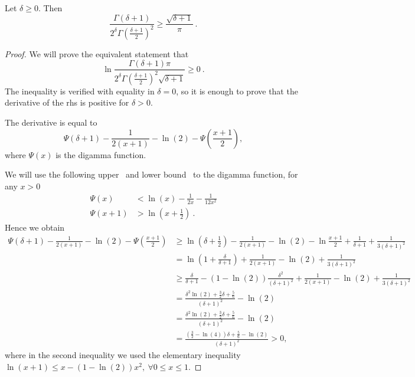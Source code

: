 \begin{lemma}
Let $\delta \geq 0$. Then
\[
\frac{\Gamma(\delta+1)}{2^\delta \Gamma(\frac{\delta+1}{2})^2} 
\geq \frac{\sqrt{\delta+1}}{\pi}~.
\]
\end{lemma}
\begin{proof}
We will prove the equivalent statement that
\[
\ln \frac{\Gamma(\delta+1) \pi}{2^\delta \Gamma(\frac{\delta+1}{2})^2 \sqrt{\delta+1}} \geq 0~.
\]
The inequality is verified with equality in $\delta=0$, so it is enough to prove that the derivative of the rhs is positive for $\delta>0$.

The derivative is equal to
\[
\Psi(\delta+1) - \frac{1}{2(x+1)} -\ln(2) -\Psi(\frac{x+1}{2}),
\]
where $\Psi(x)$ is the digamma function.

We will use the following upper~\citep{Chen05} and lower bound~\citep{Batir08} to the digamma function, for any $x>0$
\begin{align*}
\Psi(x) &< \ln(x) -\frac{1}{2x} -\frac{1}{12 x^2}\\
\Psi(x+1) &> \ln(x+\frac{1}{2})~.
\end{align*}
Hence we obtain
\begin{align*}
\Psi(\delta+1) - \frac{1}{2(x+1)} -\ln(2) -\Psi(\frac{x+1}{2})
&\geq \ln(\delta+\frac{1}{2})- \frac{1}{2(x+1)} -\ln(2) -\ln\frac{x+1}{2} +\frac{1}{\delta+1} +\frac{1}{3 (\delta+1)^2} \\
&= \ln(1+\frac{\delta}{\delta+1})+ \frac{1}{2(x+1)} -\ln(2)+\frac{1}{3 (\delta+1)^2} \\
&\geq \frac{\delta}{\delta+1} - (1-\ln(2))\frac{\delta^2}{(\delta+1)^2}+ \frac{1}{2(x+1)} -\ln(2)+\frac{1}{3 (\delta+1)^2}\\
&= \frac{\delta^2 \ln(2)+\frac{3}{2}\delta +\frac{5}{6}}{(\delta+1)^2} - \ln(2)\\
&= \frac{\delta^2 \ln(2)+ \frac{3}{2}\delta +\frac{5}{6}}{(\delta+1)^2} - \ln(2)\\
&= \frac{(\frac{3}{2}-\ln(4)) \delta +\frac{5}{6}-\ln(2)}{(\delta+1)^2} >0,
\end{align*}
where in the second inequality we used the elementary inequality $\ln(x+1) \leq x - (1-\ln(2))x^2, \ \forall 0\leq x \leq 1$.
\end{proof}
